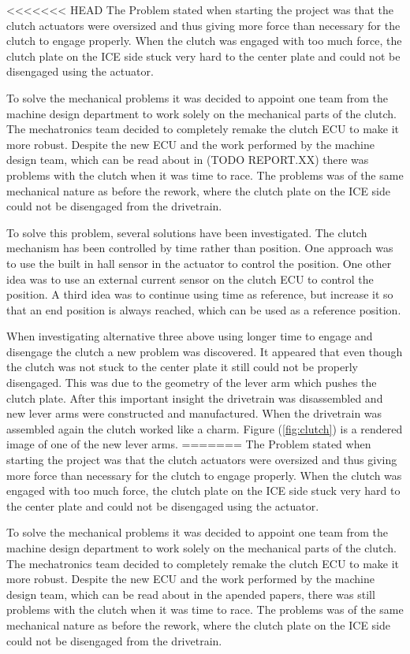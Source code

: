 <<<<<<< HEAD
The Problem stated when starting the project was that the clutch actuators were
oversized and thus giving more force than necessary for the clutch to engage
properly. When the clutch was engaged with too much force, the clutch plate on
the ICE side stuck very hard to the center plate and could not be disengaged
using the actuator.

To solve the mechanical problems it was decided to appoint one team from the
machine design department to work solely on the mechanical parts of the clutch.
The mechatronics team decided to completely remake the clutch ECU to make it
more robust. Despite the new ECU and the work performed by the machine design
team, which can be read about in (TODO REPORT.XX) there was problems with the
clutch when it was time to race. The problems was of the same mechanical nature
as before the rework, where the clutch plate on the ICE side could not be
disengaged from the drivetrain.

To solve this problem, several solutions have been investigated. The clutch
mechanism has been controlled by time rather than position. One approach was to
use the built in hall sensor in the actuator to control the position. One other
idea was to use an external current sensor on the clutch ECU to control the
position. A third idea was to continue using time as reference, but increase it
so that an end position is always reached, which can be used as a reference
position.

When investigating alternative three above using longer time to engage and
disengage the clutch a new problem was discovered. It appeared that even though
the clutch was not stuck to the center plate it still could not be properly
disengaged. This was due to the geometry of the lever arm which pushes the
clutch plate.  After this important insight the drivetrain was disassembled and
new lever arms were constructed and manufactured. When the drivetrain was
assembled again the clutch worked like a charm. Figure (\ref{fig:clutch}) is a
rendered image of one of the new lever arms.
=======
The Problem stated when starting the project was that the clutch actuators were oversized and thus giving more force than necessary for the clutch to engage properly. When the clutch was engaged with too much force, the clutch plate on the ICE side stuck very hard to the center plate and could not be disengaged using the actuator.

To solve the mechanical problems it was decided to appoint one team from the machine design department to work solely on the mechanical parts of the clutch. The mechatronics team decided to completely remake the clutch ECU to make it more robust. Despite the new ECU and the work performed by the machine design team, which can be read about in the apended papers, there was still problems with the clutch when it was time to race. The problems was of the same mechanical nature as before the rework, where the clutch plate on the ICE side could not be disengaged from the drivetrain.

